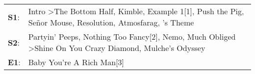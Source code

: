 \begin{supertabular}{p{0.03\textwidth}p{0.92\textwidth}}
 \textbf{S1}:  &  Intro\textsuperscript{} \textgreater \enspace The Bottom Half\textsuperscript{}, \enspace Kimble\textsuperscript{}, \enspace Example 1[1]\textsuperscript{}, \enspace Push the Pig\textsuperscript{}, \enspace Señor Mouse\textsuperscript{}, \enspace Resolution\textsuperscript{}, \enspace Atmosfarag\textsuperscript{}, 's Theme\textsuperscript{}  \enspace  \\
 \textbf{S2}:  &                                                                                        Partyin' Peeps\textsuperscript{}, \enspace Nothing Too Fancy[2]\textsuperscript{}, \enspace Nemo\textsuperscript{}, \enspace Much Obliged\textsuperscript{} \textgreater \enspace Shine On You Crazy Diamond\textsuperscript{}, \enspace Mulche's Odyssey\textsuperscript{}  \enspace  \\
 \textbf{E1}:  &                                                                                                                                                                                                                                                                                                                        Baby You're A Rich Man[3]\textsuperscript{}  \enspace  \\
\end{supertabular}
